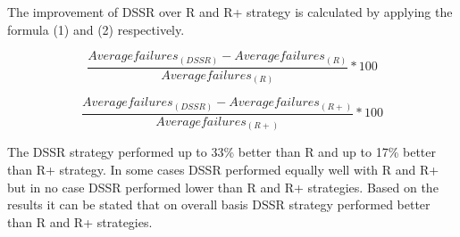 The improvement of DSSR over R and R+ strategy is calculated by applying the formula (1) and (2) respectively.

\begin{equation} \frac{Averagefailures_{(DSSR)} - Averagefailures_{(R)}}{Averagefailures_{(R)}} * 100  \end{equation}

\begin{equation} \frac{Averagefailures_{(DSSR)} - Averagefailures_{(R+)}}{Averagefailures_{(R+)}}  * 100 \end{equation}

The DSSR strategy performed up to 33\% better than R and up to 17\% better than R+ strategy. In some cases DSSR performed equally well with R and R+ but in no case DSSR performed lower than R and R+ strategies. Based on the results it can be stated that on overall basis DSSR strategy performed better than R and R+ strategies. 

